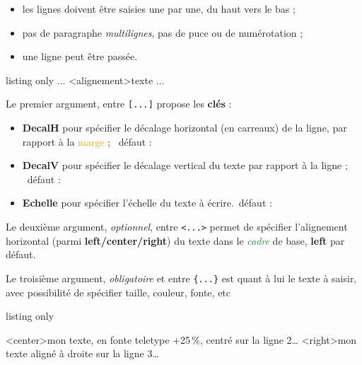 \documentclass[a4paper]{article}
\newcommand\Cle[1]{{\bfseries\sffamily\textlangle #1\textrangle}}
\begin{document}
\begin{itemize}
	\item les lignes doivent être saisies une par une, du \og haut \fg{} vers le \og bas \fg{} ;
	\item pas de paragraphe \textit{multilignes}, pas de puce ou de numérotation ;
	\item une ligne peut être passée.
\end{itemize}

\begin{PresentationCode}{listing only}
...
	\EcrireLigne[clés]<alignement>{texte}
	\PasseLigne
...
\end{PresentationCode}

Le premier argument, entre \texttt{[...]} propose les \Cle{clés} :

\begin{itemize}
	\item \Cle{DecalH} pour spécifier le décalage horizontal (en carreaux) de la ligne, par rapport à la \textcolor{orange}{marge} ; \hfill~défaut : \Cle{0}
	\item \Cle{DecalV} pour spécifier le décalage vertical du texte par rapport à la ligne ; \hfill~défaut : \Cle{0pt}
	\item \Cle{Echelle} pour spécifier l'échelle du texte à écrire.\hfill~défaut : \Cle{1}
\end{itemize}

Le deuxième argument, \textit{optionnel}, entre \texttt{<...>} permet de spécifier l'alignement horizontal (parmi \Cle{left/center/right}) du texte dans le \textcolor{ForestGreen}{\textit{cadre}} de base, \Cle{left} par défaut.

\medskip

Le troisième argument, \textit{obligatoire} et entre \texttt{\{...\}} est quant à lui le texte à saisir, avec possibilité de spécifier taille, couleur, fonte, etc

\begin{PresentationCode}{listing only}
\begin{EnvQuadrillage}[NbCarreaux=36x8]
	\EcrireLigne[Echelle=1.25]<center>{\ttfamily mon texte, en fonte teletype +25\,\%, centré sur la ligne 2\ldots}
	\EcrireLigne<right>{mon texte aligné à droite sur la ligne 3\ldots}
	\EcrireLigne[DecalV=0.1]{\textcolor{red}{mon texte rouge sur la ligne 4, décalé de 1mm vers le haut\ldots}}
	\PasseLigne
\end{EnvQuadrillage}
\end{PresentationCode}
\end{document}
